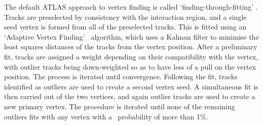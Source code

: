The default ATLAS approach to vertex finding is called
`finding-through-fitting' \cite{1742-6596-119-3-032033}. Tracks are preselected
by consistency with the interaction region, and a single seed vertex is formed
from all of the preselected tracks. This is fitted using an `Adaptive Vertex
Finding'~\cite{0954-3899-34-12-N01} algorithm, which uses a Kalman filter to
minimise the least squares distances of the tracks from the vertex position.
After a preliminary fit, tracks are assigned a weight depending on their
compatibility with the vertex, with outlier tracks being down-weighted so as to
have less of a pull on the vertex position. The process is iterated until
convergence.  Following the fit, tracks identified as outliers are used to
create a second vertex seed. A simultaneous fit is then carried out of the two
vertices, and again outlier tracks are used to create a new primary vertex. The
procedure is iterated until none of the remaining outliers fits with any vertex
with a \chisquared\ probability of more than 1\%.
